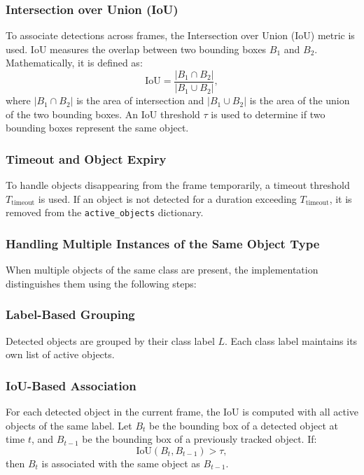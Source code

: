 \documentclass[conference]{IEEEtran}
\begin{document}
\subsubsection{Intersection over Union (IoU)}
To associate detections across frames, the Intersection over Union (IoU) metric is used. IoU measures the overlap between two bounding boxes $B_1$ and $B_2$. Mathematically, it is defined as:
\begin{equation}
\text{IoU} = \frac{|B_1 \cap B_2|}{|B_1 \cup B_2|},
\end{equation}
where $|B_1 \cap B_2|$ is the area of intersection and $|B_1 \cup B_2|$ is the area of the union of the two bounding boxes. An IoU threshold $\tau$ is used to determine if two bounding boxes represent the same object.

\subsubsection{Timeout and Object Expiry}
To handle objects disappearing from the frame temporarily, a timeout threshold $T_{\text{timeout}}$ is used. If an object is not detected for a duration exceeding $T_{\text{timeout}}$, it is removed from the \texttt{active\_objects} dictionary.

\subsubsection{Handling Multiple Instances of the Same Object Type}
When multiple objects of the same class are present, the implementation distinguishes them using the following steps:

\subsubsection{Label-Based Grouping}
Detected objects are grouped by their class label $L$. Each class label maintains its own list of active objects.

\subsubsection{IoU-Based Association}
For each detected object in the current frame, the IoU is computed with all active objects of the same label. Let $B_t$ be the bounding box of a detected object at time $t$, and $B_{t-1}$ be the bounding box of a previously tracked object. If:
\begin{equation}
\text{IoU}(B_t, B_{t-1}) > \tau,
\end{equation}
then $B_t$ is associated with the same object as $B_{t-1}$.
\end{document}
